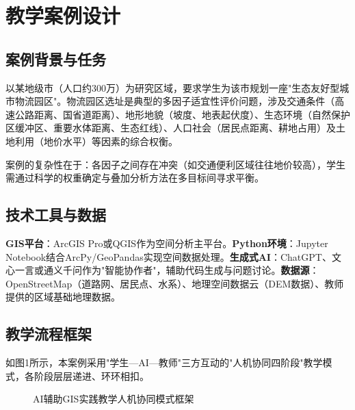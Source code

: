 \section{教学案例设计}

\subsection{案例背景与任务}

以某地级市（人口约300万）为研究区域，要求学生为该市规划一座"生态友好型城市物流园区"。物流园区选址是典型的多因子适宜性评价问题，涉及交通条件（高速公路距离、国省道距离）、地形地貌（坡度、地表起伏度）、生态环境（自然保护区缓冲区、重要水体距离、生态红线）、人口社会（居民点距离、耕地占用）及土地利用（地价水平）等因素的综合权衡。

案例的复杂性在于：各因子之间存在冲突（如交通便利区域往往地价较高），学生需通过科学的权重确定与叠加分析方法在多目标间寻求平衡。

\subsection{技术工具与数据}

\textbf{GIS平台}：ArcGIS Pro或QGIS作为空间分析主平台。\textbf{Python环境}：Jupyter Notebook结合ArcPy/GeoPandas实现空间数据处理。\textbf{生成式AI}：ChatGPT、文心一言或通义千问作为"智能协作者"，辅助代码生成与问题讨论。\textbf{数据源}：OpenStreetMap（道路网、居民点、水系）、地理空间数据云（DEM数据）、教师提供的区域基础地理数据。

\subsection{教学流程框架}

如图1所示，本案例采用"学生—AI—教师"三方互动的"人机协同四阶段"教学模式，各阶段层层递进、环环相扣。

\begin{figure}[htbp]
\centering
{}
\caption{AI辅助GIS实践教学人机协同模式框架}
\label{fig:framework}
\end{figure}